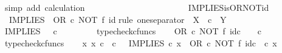 \begin{isabellebody}
\ {\isacharparenleft}{\kern0pt}simp\ add{\isacharcolon}{\kern0pt}\ calculation{\isacharparenright}{\kern0pt}\isanewline
\ \ \ \ \ \ \ \ \isamarkupfalse%
\isanewline
\ \ \ \ \ \ \isamarkupfalse%
\isanewline
\ \ \ \ \isamarkupfalse%
\isanewline
\ \ \isamarkupfalse%
\isanewline
{}\isamarkupfalse%
%
\endisatagproof
{\isafoldproof}%
%
\isadelimproof
\isanewline
%
\endisadelimproof
\isanewline
{}\isamarkupfalse%
\ IMPLIES{\isacharunderscore}{\kern0pt}is{\isacharunderscore}{\kern0pt}OR{\isacharunderscore}{\kern0pt}NOT{\isacharunderscore}{\kern0pt}id{\isacharcolon}{\kern0pt}\isanewline
\ \ {\isachardoublequoteopen}IMPLIES\ {\isacharequal}{\kern0pt}\ OR\ {\isasymcirc}\isactrlsub c\ {\isacharparenleft}{\kern0pt}NOT\ {\isasymtimes}\isactrlsub f\ id{\isacharparenleft}{\kern0pt}{\isasymOmega}{\isacharparenright}{\kern0pt}{\isacharparenright}{\kern0pt}{\isachardoublequoteclose}\isanewline
%
\isadelimproof
%
\endisadelimproof
%
\isatagproof
{}\isamarkupfalse%
{\isacharparenleft}{\kern0pt}rule\ one{\isacharunderscore}{\kern0pt}separator{\isacharbrackleft}{\kern0pt}\ \ X\ {\isacharequal}{\kern0pt}\ {\isachardoublequoteopen}{\isasymOmega}{\isasymtimes}\isactrlsub c{\isasymOmega}{\isachardoublequoteclose}{\isacharcomma}{\kern0pt}\ \ Y\ {\isacharequal}{\kern0pt}\ {\isachardoublequoteopen}{\isasymOmega}{\isachardoublequoteclose}{\isacharbrackright}{\kern0pt}{\isacharparenright}{\kern0pt}\isanewline
\ \ \isamarkupfalse%
\ {\isachardoublequoteopen}IMPLIES\ {\isacharcolon}{\kern0pt}\ {\isasymOmega}\ {\isasymtimes}\isactrlsub c\ {\isasymOmega}\ {\isasymrightarrow}\ {\isasymOmega}{\isachardoublequoteclose}\isanewline
\ \ \ \ \isamarkupfalse%
\ typecheck{\isacharunderscore}{\kern0pt}cfuncs\isanewline
\ \ \isamarkupfalse%
\ {\isachardoublequoteopen}OR\ {\isasymcirc}\isactrlsub c\ NOT\ {\isasymtimes}\isactrlsub f\ id\isactrlsub c\ {\isasymOmega}\ {\isacharcolon}{\kern0pt}\ {\isasymOmega}\ {\isasymtimes}\isactrlsub c\ {\isasymOmega}\ {\isasymrightarrow}\ {\isasymOmega}{\isachardoublequoteclose}\isanewline
\ \ \ \ \isamarkupfalse%
\ typecheck{\isacharunderscore}{\kern0pt}cfuncs\isanewline
\ \ \isamarkupfalse%
\ {\isachardoublequoteopen}{\isasymAnd}x{\isachardot}{\kern0pt}\ x\ {\isasymin}\isactrlsub c\ {\isasymOmega}\ {\isasymtimes}\isactrlsub c\ {\isasymOmega}\ {\isasymLongrightarrow}\ IMPLIES\ {\isasymcirc}\isactrlsub c\ x\ {\isacharequal}{\kern0pt}\ {\isacharparenleft}{\kern0pt}OR\ {\isasymcirc}\isactrlsub c\ NOT\ {\isasymtimes}\isactrlsub f\ id\isactrlsub c\ {\isasymOmega}{\isacharparenright}{\kern0pt}\ {\isasymcirc}\isactrlsub c\ x{\isachardoublequoteclose}\isanewline

\end{isabellebody}
